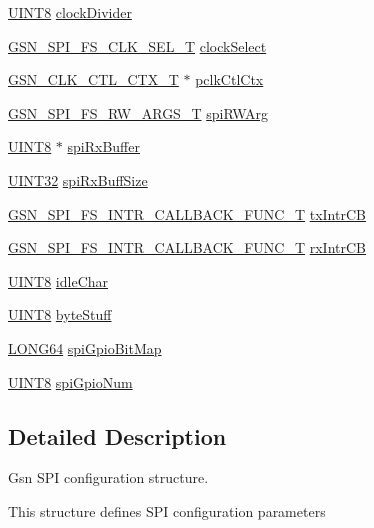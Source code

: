 \begin{DoxyCompactItemize}
\item 
\hyperlink{a00660_gab27e9918b538ce9d8ca692479b375b6a}{UINT8} \hyperlink{a00233_ae7807face22c73f3541066336176a60d}{clockDivider}
\item 
\hyperlink{a00655_ga0d31f3f2784c160b1ad748b232f4ae7b}{GSN\_\-SPI\_\-FS\_\-CLK\_\-SEL\_\-T} \hyperlink{a00233_aafc9460aea176e2b77f84f6d8505b5dc}{clockSelect}
\item 
\hyperlink{a00039}{GSN\_\-CLK\_\-CTL\_\-CTX\_\-T} $\ast$ \hyperlink{a00233_a87fd9dda5636bd71a412693b96fed177}{pclkCtlCtx}
\item 
\hyperlink{a00235}{GSN\_\-SPI\_\-FS\_\-RW\_\-ARGS\_\-T} \hyperlink{a00233_ae5d2dc9000a0a784dfad8020cc9bd8a5}{spiRWArg}
\item 
\hyperlink{a00660_gab27e9918b538ce9d8ca692479b375b6a}{UINT8} $\ast$ \hyperlink{a00233_aa07b66f7f4a73b04e5ffaf3f29b4b414}{spiRxBuffer}
\item 
\hyperlink{a00660_gae1e6edbbc26d6fbc71a90190d0266018}{UINT32} \hyperlink{a00233_a0b720c9f52a6b5aa0634f432850766ec}{spiRxBuffSize}
\item 
\hyperlink{a00655_gaccc2e6d52833a5b6d9bbdd2506521d89}{GSN\_\-SPI\_\-FS\_\-INTR\_\-CALLBACK\_\-FUNC\_\-T} \hyperlink{a00233_a6325a4c01ac28ef24556da869462013f}{txIntrCB}
\item 
\hyperlink{a00655_gaccc2e6d52833a5b6d9bbdd2506521d89}{GSN\_\-SPI\_\-FS\_\-INTR\_\-CALLBACK\_\-FUNC\_\-T} \hyperlink{a00233_aec97c6dc1aa53452aa2e39aa1f1ff89f}{rxIntrCB}
\item 
\hyperlink{a00660_gab27e9918b538ce9d8ca692479b375b6a}{UINT8} \hyperlink{a00233_abf7d1a3fd39bc4650832af3d1f22a59d}{idleChar}
\item 
\hyperlink{a00660_gab27e9918b538ce9d8ca692479b375b6a}{UINT8} \hyperlink{a00233_a7607005ffbebdca79ab3c4d558d0e442}{byteStuff}
\item 
\hyperlink{a00660_gae57305825c7d329ad8a3065ae045e875}{LONG64} \hyperlink{a00233_a0b3967ea299cf8eb236778533abc97be}{spiGpioBitMap}
\item 
\hyperlink{a00660_gab27e9918b538ce9d8ca692479b375b6a}{UINT8} \hyperlink{a00233_acc43f8ead3863da116dd2976ae02bb92}{spiGpioNum}
\end{DoxyCompactItemize}


\subsection{Detailed Description}
Gsn SPI configuration structure. 

This structure defines SPI configuration parameters

